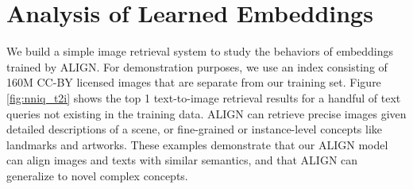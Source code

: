 \documentclass{article}
\begin{document}
\begin{table}[h!]
\vspace{-5mm}
    \centering
    \small
    \caption{Tradeoff between training data size and quality.}
    \label{tab:ablation_data_tradeoff}
    \vspace{1mm}
\vspace{-5mm}
\end{table}


\section{Analysis of Learned Embeddings}

We build a simple image retrieval system to study the behaviors of embeddings trained by ALIGN. For demonstration purposes, we use an index consisting of 160M CC-BY licensed images that are separate from our training set. Figure \ref{fig:nniq_t2i} shows the top 1 text-to-image retrieval results for a handful of text queries not existing in the training data. ALIGN can retrieve precise images given detailed descriptions of a scene, or fine-grained or instance-level concepts like landmarks and artworks. These examples demonstrate that our ALIGN model can align images and texts with similar semantics, and that ALIGN can generalize to novel complex concepts.
\end{document}
